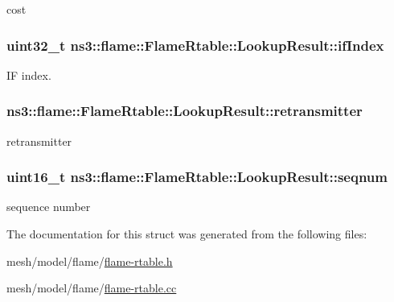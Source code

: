 cost 

\subsubsection[{\texorpdfstring{if\+Index}{ifIndex}}]{\setlength{\rightskip}{0pt plus 5cm}uint32\+\_\+t ns3\+::flame\+::\+Flame\+Rtable\+::\+Lookup\+Result\+::if\+Index}\hypertarget{structns3_1_1flame_1_1FlameRtable_1_1LookupResult_a8b742221f0db31d18510533dfb231892}{}\label{structns3_1_1flame_1_1FlameRtable_1_1LookupResult_a8b742221f0db31d18510533dfb231892}


IF index. 

\subsubsection[{\texorpdfstring{retransmitter}{retransmitter}}]{ ns3\+::flame\+::\+Flame\+Rtable\+::\+Lookup\+Result\+::retransmitter}\hypertarget{structns3_1_1flame_1_1FlameRtable_1_1LookupResult_af180198f1e8e3583a49c63a983991822}{}\label{structns3_1_1flame_1_1FlameRtable_1_1LookupResult_af180198f1e8e3583a49c63a983991822}


retransmitter 

\subsubsection[{\texorpdfstring{seqnum}{seqnum}}]{\setlength{\rightskip}{0pt plus 5cm}uint16\+\_\+t ns3\+::flame\+::\+Flame\+Rtable\+::\+Lookup\+Result\+::seqnum}\hypertarget{structns3_1_1flame_1_1FlameRtable_1_1LookupResult_aa97819ae916abeff16ecbfc163f9cc30}{}\label{structns3_1_1flame_1_1FlameRtable_1_1LookupResult_aa97819ae916abeff16ecbfc163f9cc30}


sequence number 



The documentation for this struct was generated from the following files\+:\begin{DoxyCompactItemize}
\item 
mesh/model/flame/\hyperlink{flame-rtable_8h}{flame-\/rtable.\+h}\item 
mesh/model/flame/\hyperlink{flame-rtable_8cc}{flame-\/rtable.\+cc}\end{DoxyCompactItemize}

